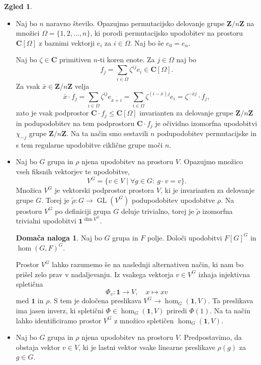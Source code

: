 \documentclass[11pt]{book}
\def\ZZ{\mathbf{Z}}
\def\CC{\mathbf{C}}
\def\11{\mathbf{1}}
\DeclareMathOperator\GL{GL}
\theoremstyle{definition}
\theoremstyle{zgled}
\newtheorem*{zgled}{Zgled}
\theoremstyle{odprtproblem}
\theoremstyle{domacanaloga}
\newtheorem*{domacanaloga}{Domača naloga}
\theoremstyle{izrek}
\begin{document}
\begin{zgled} \leavevmode
\begin{itemize}
    \item Naj bo $n$ naravno število. Opazujmo permutacijsko delovanje grupe $\ZZ/n\ZZ$ na množici $\Omega = \{ 1, 2, \dots, n \}$, ki porodi permutacijsko upodobitev na prostoru $\CC[\Omega]$ z baznimi vektorji $e_i$ za $i \in \Omega$. Naj bo še $e_0 = e_n$.
    
    Naj bo $\zeta \in \CC$ primitiven $n$-ti koren enote. Za $j \in \Omega$ naj bo
    \[
        f_j = \sum_{i \in \Omega} \zeta^{ij} e_i \in \CC[\Omega].
    \]
    Za vsak $\bar x \in \ZZ/n\ZZ$ velja
    \[
        \bar x \cdot f_j =
        \sum_{i \in \Omega} \zeta^{ij} e_{\overline{x + i}} =
        \sum_{i \in \Omega} \zeta^{(i - \bar x)j} e_{i} =
        \zeta^{-\bar x j} \cdot f_j,
    \]
    zato je vsak podprostor $\CC \cdot f_j \leq \CC[\Omega]$ invarianten za delovanje grupe $\ZZ/n\ZZ$ in podupodobitev na tem podprostoru $\CC \cdot f_j$ je očividno izomorfna upodobitvi $\chi_{-j}$ grupe $\ZZ/n\ZZ$. Na ta način smo sestavili $n$ podupodobitev permutacijske in s tem regularne upodobitve ciklične grupe moči $n$.

    \item Naj bo $G$ grupa in $\rho$ njena upodobitev na prostoru $V$. Opazujmo množico vseh fiksnih vektorjev te upodobitve,
    \[
        V^G = \{ v \in V \mid \forall g \in G \colon \ g \cdot v = v \}.
    \]
    Množica $V^G$ je vektorski podprostor prostora $V$, ki je invarianten za delovanje grupe $G$. Torej je $\tilde \rho \colon G \to \GL(V^G)$ podupodobitev upodobitve $\rho$. Na prostoru $V^G$ po definiciji grupa $G$ deluje trivialno, torej je $\tilde \rho$ izomorfna trivialni upodobitvi $\11^{\dim V^G}$.

    \begin{domacanaloga}
        Naj bo $G$ grupa in $F$ polje. Določi upodobitvi $F[G]^G$ in $\hom(G,F)^G$.
    \end{domacanaloga}

    Prostor $V^G$ lahko razumemo še na naslednji alternativen način, ki nam bo prišel zelo prav v nadaljevanju. Iz vsakega vektorja $v \in V^G$ izhaja injektivna spletična
    \[
        \Phi_v \colon \11 \to V, \quad
        x \mapsto x v
    \]
    med $\11$ in $\rho$. S tem je določena preslikava $V^G \to \hom_G(\11, V)$. Ta preslikava ima jasen inverz, ki spletični $\Phi \in \hom_G(\11, V)$ priredi $\Phi(1)$. Na ta način lahko identificiramo prostor $V^G$ z množico spletičen $\hom_G(\11, V)$.
    \item Naj bo $G$ grupa in $\rho$ njena upodobitev na prostoru $V$. Predpostavimo, da obstaja vektor $v \in V$, ki je lastni vektor vsake linearne preslikave $\rho(g)$ za $g \in G$. 
    

\end{itemize}
\end{zgled}
\end{document}
